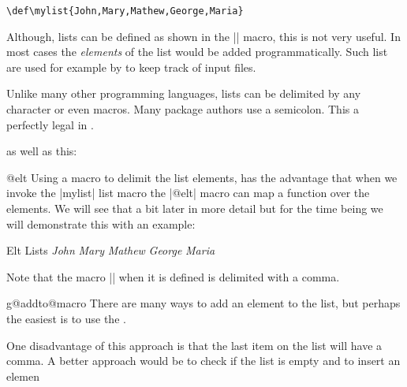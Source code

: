 \begin{verbatim}
\def\mylist{John,Mary,Mathew,George,Maria}
\end{verbatim}

Although, lists can be defined as shown in the |\mylist| macro, this is not very useful. In most cases the \textit{elements} of the list would be added programmatically. Such list are used for example by \latex to keep track of input files.

Unlike many other programming languages, lists can be delimited by any character or even macros. Many package authors use a semicolon. This a perfectly legal in \tex.

\begin{teX}
\end{teX}
as well as this:

\begin{teX}
\end{teX}

\begin{docCommand}{@elt}{}
Using a macro to delimit the list elements, has the advantage that when we invoke the |mylist| list macro the |@elt| macro can map a function over the elements. We will see that a bit later in more detail but for the time being we will demonstrate this with an example:
\end{docCommand}

\begin{texexample}{Elt Lists}{}
\def\mylist{\@elt John,\@elt Mary,\@elt Mathew, \@elt George, \@elt Maria,}
\def\@elt#1,{\textit{#1} }
\mylist
\end{texexample}

Note that the macro |\@elt| when it is defined is delimited with a comma. 


\begin{docCommand}{g@addto@macro}{}
There are many ways to add an element to the list, but perhaps the easiest is to use the \latex \cmd{\g@addto@macro}. 
\end{docCommand}

\begin{teXXX}
\mylist
\end{teXXX}

One disadvantage of this approach is that the last item on the list will have a comma. A better approach would be to check if
the list is empty and to insert an elemen

